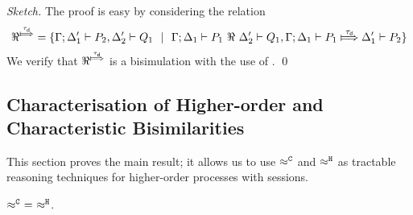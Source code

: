 \begin{proof}[Sketch]
	The proof is easy by considering the relation
	\[
		\Re^{\Hby{\dtau}} = \set{ \horel{\Gamma}{\Delta_1'}{P_2}{,}{\Delta_2'}{Q_1} \setbar \horel{\Gamma}{\Delta_1}{P_1}{\ \Re\ }{\Delta_2'}{Q_1},
		\horel{\Gamma}{\Delta_1}{P_1}{\Hby{\dtau}}{\Delta_1'}{P_2} }
	\]
	We verify that $\Re^{\Hby{\dtau}}$ is a bisimulation with
	the use of .
	\qed
\end{proof}



\subsection{Characterisation of Higher-order and Characteristic Bisimilarities}
\label{ss:charact}

This section proves the main result; %
it allows us to use $\approx^\mathtt{C}$ and $\approx^\mathtt{H}$   as tractable reasoning
techniques for higher-order processes with sessions.


\begin{lemma}
	\label{lem:wb_eq_wbf}
	$\approx^\mathtt{C}\ =\ \approx^\mathtt{H}$.
\end{lemma}

